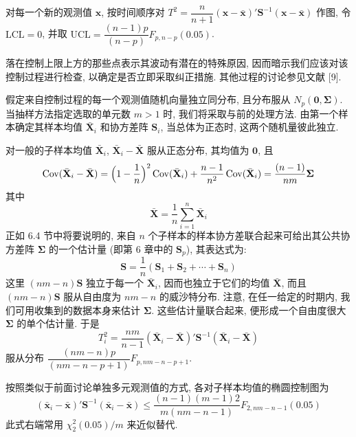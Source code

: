 
对每一个新的观测值 $\mathbf{x}$, 按时间顺序对 $T^{2}=\dfrac{n}{n+1}(\mathbf{x}-\bar{\mathbf{x}})'\mathbf{S}^{-1}(\mathbf{x}-\bar{\mathbf{x}})$ 作图, 令 $\text{LCL}=0$, 并取 $\text{UCL}=\dfrac{(n-1)p}{(n-p)}F_{p,n-p}(0.05)$.

落在控制上限上方的那些点表示其波动有潜在的特殊原因, 因而暗示我们应该对该控制过程进行检查, 以确定是否立即采取纠正措施. 其他过程的讨论参见文献 [9].


假定来自控制过程的每一个观测值随机向量独立同分布, 且分布服从 $N_{p}(\mathbf{0},\boldsymbol{\Sigma})$. 当抽样方法指定选取的单元数 $m>1$ 时, 我们将采取与前的处理方法. 由第一个样本确定其样本均值 $\bar{\mathbf{X}}_{i}$ 和协方差阵 $\mathbf{S}_{i}$, 当总体为正态时, 这两个随机量彼此独立.

对一般的子样本均值 $\bar{\mathbf{X}}_{i}$, $\bar{\mathbf{X}}_{i}-\bar{\mathbf{X}}$ 服从正态分布, 其均值为 $\mathbf{0}$, 且
\[
\operatorname{Cov}(\bar{\mathbf{X}}_{i}-\bar{\mathbf{X}})=\Bigl(1-\frac{1}{n}\Bigr)^{2}\operatorname{Cov}(\bar{\mathbf{X}}_{i})+\frac{n-1}{n^{2}}\operatorname{Cov}(\bar{\mathbf{X}}_{i})=\frac{(n-1)}{nm}\boldsymbol{\Sigma}
\]
其中
\[
\bar{\mathbf{X}}=\frac{1}{n}\sum_{i=1}^{n}\bar{\mathbf{X}}_{i}
\]
正如 6.4 节中将要说明的, 来自 $n$ 个子样本的样本协方差联合起来可给出其公共协方差阵 $\boldsymbol{\Sigma}$ 的一个估计量 (即第 6 章中的 $\mathbf{S}_{p}$), 其表达式为:
\[
\mathbf{S}=\frac{1}{n}(\mathbf{S}_{1}+\mathbf{S}_{2}+\cdots+\mathbf{S}_{n})
\]
这里 $(nm-n)\mathbf{S}$ 独立于每一个 $\bar{\mathbf{X}}_{i}$, 因而也独立于它们的均值 $\bar{\mathbf{X}}$, 而且 $(nm-n)\mathbf{S}$ 服从自由度为 $nm-n$ 的威沙特分布. 注意, 在任一给定的时期内, 我们可用收集到的数据本身来估计 $\boldsymbol{\Sigma}$. 这些估计量联合起来, 便形成一个自由度很大 $\boldsymbol{\Sigma}$ 的单个估计量. 于是
\label{eq:5-35}
\begin{equation}
T_{i}^{2}=\frac{nm}{n-1}(\bar{\mathbf{X}}_{i}-\bar{\mathbf{X}})'\mathbf{S}^{-1}(\bar{\mathbf{X}}_{i}-\bar{\mathbf{X}})
\tag{5-35}
\end{equation}
服从分布 $\dfrac{(nm-n)p}{(nm-n-p+1)}F_{p,nm-n-p+1}$.

\medskip
\noindent{}\quad 按照类似于前面讨论单独多元观测值的方式, 各对子样本均值的椭圆控制图为
\label{eq:5-36}
\begin{equation}
(\bar{\mathbf{x}}_{i}-\bar{\mathbf{x}})'\mathbf{S}^{-1}(\bar{\mathbf{x}}_{i}-\bar{\mathbf{x}})\le\frac{(n-1)(m-1)2}{m(nm-n-1)}F_{2,nm-n-1}(0.05)
\tag{5-36}
\end{equation}
此式右端常用 $\chi_{2}^{2}(0.05)/m$ 来近似替代.

